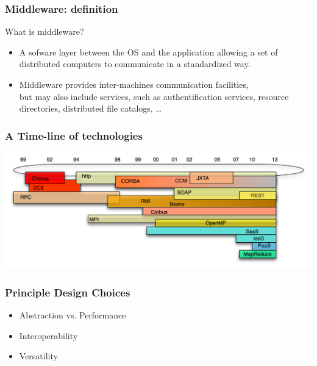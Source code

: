 \documentclass[bigger,hyperref={colorlinks=true, urlcolor=red, plainpages=false, pdfpagelabels, bookmarksnumbered}]{beamer}
\begin{document}
\begin{frame}
\frametitle{Middleware: definition}
\label{sec-1-3}
\begin{block}{What is middleware?}
\label{sec-1-3-1}

\begin{itemize}
\item A sofware layer between the OS and the application allowing 
      a set of distributed computers to communicate in a standardized
      way.
\end{itemize}
\end{block}
\begin{itemize}

\item Middleware provides inter-machines communication facilities,\\
\label{sec-1-3-2}%
but may also include services, such as authentification services,
    resource directories, distributed file catalogs, \ldots{}
     
\end{itemize} %
\end{frame}
\begin{frame}
\frametitle{A Time-line of technologies}
\label{sec-1-4}

  \includegraphics[width=.9\linewidth]{../img/timeline.png}
\end{frame}
\begin{frame}
\frametitle{Principle Design Choices}
\label{sec-1-5}

\begin{itemize}
\item Abstraction vs. Performance
\item Interoperability
\item Versatility
\end{itemize}
\end{frame}
\end{document}
